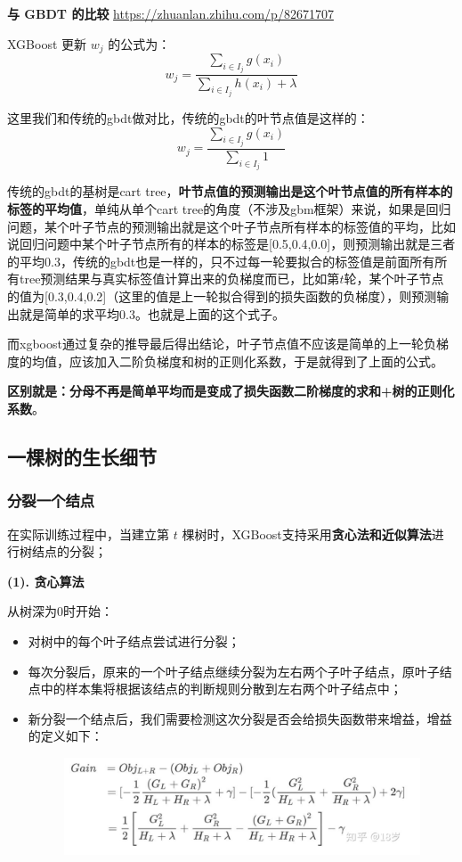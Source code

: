 \documentclass[12pt]{article}
\begin{document}
\begin{framed}
\textbf{与 GBDT 的比较}
\url{https://zhuanlan.zhihu.com/p/82671707}

XGBoost 更新 $w_j$ 的公式为：
$$
w_j = \frac{\sum_{i\in I_j}g(x_i)}{\sum_{i\in I_j}h(x_i) + \lambda}
$$

这里我们和传统的gbdt做对比，传统的gbdt的叶节点值是这样的：
$$
w_j = \frac{\sum_{i\in I_j}g(x_i)}{\sum_{i\in I_j}1}
$$

传统的gbdt的基树是cart tree，\textbf{叶节点值的预测输出是这个叶节点值的所有样本的标签的平均值}，单纯从单个cart tree的角度（不涉及gbm框架）来说，如果是回归问题，某个叶子节点的预测输出就是这个叶子节点所有样本的标签值的平均，比如说回归问题中某个叶子节点所有的样本的标签是[0.5,0.4,0.0]，则预测输出就是三者的平均0.3，传统的gbdt也是一样的，只不过每一轮要拟合的标签值是前面所有所有tree预测结果与真实标签值计算出来的负梯度而已，比如第$t$轮，某个叶子节点的值为[0.3,0.4,0.2]（这里的值是上一轮拟合得到的损失函数的负梯度），则预测输出就是简单的求平均0.3。也就是上面的这个式子。

而xgboost通过复杂的推导最后得出结论，叶子节点值不应该是简单的上一轮负梯度的均值，应该加入二阶负梯度和树的正则化系数，于是就得到了上面的公式。

\textbf{区别就是：分母不再是简单平均而是变成了损失函数二阶梯度的求和+树的正则化系数}。
\end{framed}

\subsection{一棵树的生长细节}
\subsubsection{分裂一个结点}
在实际训练过程中，当建立第 $t$ 棵树时，XGBoost支持采用\textbf{贪心法和近似算法}进行树结点的分裂；

\textbf{(1). 贪心算法}

从树深为0时开始：
\begin{itemize}
\setlength{\itemsep}{0pt}
\setlength{\parsep}{0pt}
\setlength{\parskip}{0pt}
    \item 对树中的每个叶子结点尝试进行分裂；
    \item 每次分裂后，原来的一个叶子结点继续分裂为左右两个子叶子结点，原叶子结点中的样本集将根据该结点的判断规则分散到左右两个叶子结点中；
    \item 新分裂一个结点后，我们需要检测这次分裂是否会给损失函数带来增益，增益的定义如下：
    \begin{figure}[H]
    \centering
    \includegraphics[width=1\textwidth]{fig/XGBoost_Tree_Eq_Node_Split_Gain.png}
	\end{figure}
\end{itemize}
\end{document}
